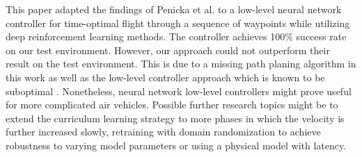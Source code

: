 This paper adapted the findings of Penicka et al. \cite{Penicka_2022} to a low-level neural network controller for time-optimal flight through a sequence of waypoints while utilizing deep reinforcement learning methods. The controller achieves 100\% success rate on our test environment. However, our approach could not outperform their result on the test environment. This is due to a missing path planing algorithm in this work as well as the low-level controller approach which is known to be suboptimal \cite{Controller_benchmarking}. Nonetheless, neural network low-level controllers might prove useful for more complicated air vehicles. Possible further research topics might be to extend the curriculum learning strategy to more phases in which the velocity is further increased slowly, retraining with domain randomization to achieve robustness to varying model parameters or using a physical model with latency.